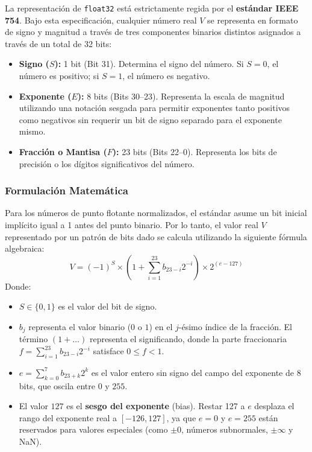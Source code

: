 \documentclass[12pt]{article}
\begin{document}
La representación de \texttt{float32} está estrictamente regida por el \textbf{estándar IEEE 754}. Bajo esta especificación, cualquier número real $V$ se representa en formato de signo y magnitud a través de tres componentes binarios distintos asignados a través de un total de 32 bits:
\begin{itemize}
    \item \textbf{Signo ($S$):} 1 bit (Bit 31). Determina el signo del número. Si $S = 0$, el número es positivo; si $S = 1$, el número es negativo.
    \item \textbf{Exponente ($E$):} 8 bits (Bits 30--23). Representa la escala de magnitud utilizando una notación sesgada para permitir exponentes tanto positivos como negativos sin requerir un bit de signo separado para el exponente mismo.
    \item \textbf{Fracción o Mantisa ($F$):} 23 bits (Bits 22--0). Representa los bits de precisión o los dígitos significativos del número.
\end{itemize}

\subsubsection*{Formulación Matemática}
Para los números de punto flotante normalizados, el estándar asume un bit inicial implícito igual a 1 antes del punto binario. Por lo tanto, el valor real $V$ representado por un patrón de bits dado se calcula utilizando la siguiente fórmula algebraica:
\begin{equation}
    V = (-1)^S \times \left(1 + \sum_{i=1}^{23} b_{23-i} 2^{-i}\right) \times 2^{(e - 127)}
\end{equation}
Donde:
\begin{itemize}
    \item $S \in \{0, 1\}$ es el valor del bit de signo.
    \item $b_j$ representa el valor binario ($0$ o $1$) en el $j$-ésimo índice de la fracción. El término $(1 + \dots)$ representa el significando, donde la parte fraccionaria $f = \sum_{i=1}^{23} b_{23-i} 2^{-i}$ satisface $0 \le f < 1$.
    \item $e = \sum_{k=0}^{7} b_{23+k} 2^k$ es el valor entero sin signo del campo del exponente de 8 bits, que oscila entre $0$ y $255$.
    \item El valor $127$ es el \textbf{sesgo del exponente} (bias). Restar 127 a $e$ desplaza el rango del exponente real a $[-126, 127]$, ya que $e=0$ y $e=255$ están reservados para valores especiales (como $\pm 0$, números subnormales, $\pm \infty$ y NaN).
\end{itemize}
\end{document}
